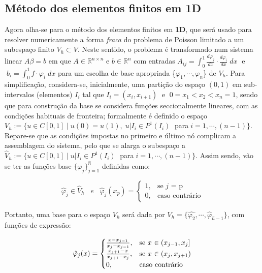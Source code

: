 \documentclass{article}
\newcommand{\R}{\mathbb{R}}
\theoremstyle{definition}
\theoremstyle{plain}
\numberwithin{equation}{section}
\newcommand{\tab}{\hspace{10mm}}
\begin{document}
\vspace{5mm}
\subsection{Método dos elementos finitos em 1D}
\tab Agora olha-se para o método dos elementos finitos em \textbf{1D}, que será usado para resolver numericamente a forma \emph{fraca} do problema de Poisson limitado a um subespaço finito $V_h \subset V$. Neste sentido, o problema é transformado num sistema linear $A\beta=b$ em que $A \in \R^{n \times n}$ e $b \in \R^n$ com entradas $A_{ij}=\int_{0}^{1} \frac{d\varphi_j}{dx} \cdot \frac{d\varphi_i}{dx} \; dx\;$ e $\; b_i=\int_{0}^{1}f \cdot \varphi_i \;dx$ para um escolha de base apropriada \{$\varphi_1, \cdots,\varphi_n$\} de $V_h$. Para simplificação, considera-se, inicialmente, uma partição do espaço $(0,1)$ em sub-intervalos (elementos) $I_i$ tal que $I_i=(x_i,x_{i+1})\;$ e $\;0=x_1<x_2<x_n=1$, sendo que para construção da base se considera funções seccionalmente lineares, com as condições habituais de fronteira; formalmente é definido o espaço $V_h:=\{u \in C[0,1] \;|\; u(0)=u(1),\; u|I_i \in P^1(I_i)\;$ para$\; i=1,\cdots,(n-1)\}$. Repare-se que as condições impostas no primeiro e último nó complicam a assemblagem do sistema, pelo que se alarga o subespaço a $\hat{V}_h:=\{u \in C[0,1] \; | \; u|I_i \in P^1(I_i)\;$ para$\; i=1,\cdots,(n-1)\}$. Assim sendo, vão se ter as funções base $\{\hat{\varphi}_j\}_{j=1}^\hat{n}$ definidas como:

\begin{equation*}
    \hat{\varphi}_j \in \hat{V}_h \; \; \; e \; \; \; \hat{\varphi}_j(x_p) = \begin{cases} 1, & \mbox{se } j\mbox{ = p} \\ 0, & \mbox{caso contrário} \end{cases}
\end{equation*}

Portanto, uma base para o espaço $V_h$ será dada por $V_h=\{\hat{\varphi_2},\cdots,\hat{\varphi}_{\hat{n}-1}\}$, com funções de expressão:



\begin{equation*}
     \hat{\varphi}_j(x) = \begin{cases} $$\frac{x-x_{j-1}} {x_j-x_{j-1}}$$, & \mbox{se } x\mbox{ $\in (x_{j-1},x_j]$} \\ $$\frac{x_{j+1}-x} {x_{j+1}-x_j}$$, & \mbox {se } x\mbox{ $\in (x_j,x_{j+1})$} \\ 0, & \mbox{caso contrário}
     \end{cases}
\end{equation*}
\end{document}
